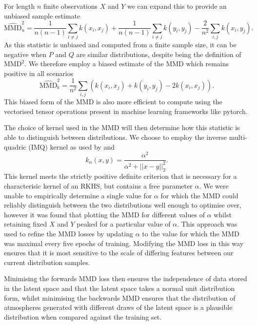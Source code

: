 For length $n$ finite observations $X$ and $Y$ we can expand this to provide an unbiased sample estimate
\begin{equation}
    \widehat{\mathrm{MMD}}_u^2 = \frac{1}{n(n-1)} \sum_{i\neq j} k(x_i, x_j) + \frac{1}{n(n-1)} \sum_{i\neq j} k(y_i, y_j) - \frac{2}{n^2} \sum_{i, j} k(x_i, y_j).
\end{equation}
As this statistic is unbiased and computed from a finite sample size, it can be negative when $P$ and $Q$ are similar distributions, despite being the definition of $\mathrm{MMD}^2$.
We therefore employ a biased estimate of the MMD which remains positive in all scenarios
\begin{equation}
    \widehat{\mathrm{MMD}}_b^2 = \frac{1}{n^2}\sum_{i, j}\left( k(x_i, x_j) + k(y_i, y_j) - 2k(x_i, x_j) \right).
\end{equation}
This biased form of the MMD is also more efficient to compute using the vectorised tensor operations present in machine learning frameworks like pytorch.

The choice of kernel used in the MMD will then determine how this statistic is able to distinguish between distributions.
We choose to employ the inverse multi-quadric (IMQ) kernel as used by \citet{2017Tolstikhin} and \citet{2018Ardizzone}
\begin{equation}
    k_\alpha(x, y) = \frac{\alpha^2}{\alpha^2 + ||x-y||_2^2}.
\end{equation}
This kernel meets the strictly positive definite criterion that is necessary for a characterisic kernel of an RKHS, but contains a free parameter $\alpha$.
We were unable to empirically determine a single value for $\alpha$ for which the MMD could reliably distinguish between the two distributions well enough to optimise over, however it was found that plotting the MMD for different values of $\alpha$ whilst retaining fixed $X$ and $Y$ peaked for a particular value of $\alpha$.
This approach was used to refine the MMD losses by updating $\alpha$ to the value for which the MMD was maximal every five epochs of training.
Modifying the MMD loss in this way ensures that it is most sensitive to the scale of differing features between our current distribution samples.

Minimising the forwards MMD loss then ensures the independence of data stored in the latent space and that the latent space takes a normal unit distribution form, whilst minimising the backwards MMD ensures that the distribution of atmospheres generated with different draws of the latent space is a plausible distribution when compared against the training set.

